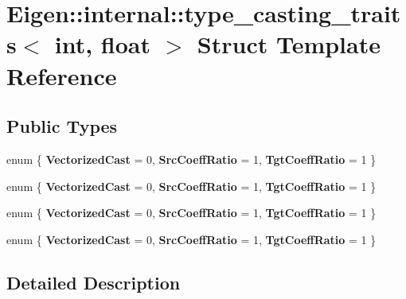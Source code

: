 \hypertarget{struct_eigen_1_1internal_1_1type__casting__traits_3_01int_00_01float_01_4}{}\section{Eigen\+:\+:internal\+:\+:type\+\_\+casting\+\_\+traits$<$ int, float $>$ Struct Template Reference}
\label{struct_eigen_1_1internal_1_1type__casting__traits_3_01int_00_01float_01_4}
\subsection*{Public Types}
\begin{DoxyCompactItemize}
\item 
\mbox{\label{struct_eigen_1_1internal_1_1type__casting__traits_3_01int_00_01float_01_4_a7f9ce914b8897d8a981d62fdc31214e6}} 
enum \{ {\bfseries Vectorized\+Cast} = 0, 
{\bfseries Src\+Coeff\+Ratio} = 1, 
{\bfseries Tgt\+Coeff\+Ratio} = 1
 \}
\item 
\mbox{\label{struct_eigen_1_1internal_1_1type__casting__traits_3_01int_00_01float_01_4_a5e1db4ee66deb363b13d32c7faecda18}} 
enum \{ {\bfseries Vectorized\+Cast} = 0, 
{\bfseries Src\+Coeff\+Ratio} = 1, 
{\bfseries Tgt\+Coeff\+Ratio} = 1
 \}
\item 
\mbox{\label{struct_eigen_1_1internal_1_1type__casting__traits_3_01int_00_01float_01_4_a87c380d6dc62dd0102051134666663b0}} 
enum \{ {\bfseries Vectorized\+Cast} = 0, 
{\bfseries Src\+Coeff\+Ratio} = 1, 
{\bfseries Tgt\+Coeff\+Ratio} = 1
 \}
\item 
\mbox{\label{struct_eigen_1_1internal_1_1type__casting__traits_3_01int_00_01float_01_4_a75d662f2f5f68d1c2aad27618cef951b}} 
enum \{ {\bfseries Vectorized\+Cast} = 0, 
{\bfseries Src\+Coeff\+Ratio} = 1, 
{\bfseries Tgt\+Coeff\+Ratio} = 1
 \}
\end{DoxyCompactItemize}


\subsection{Detailed Description}

